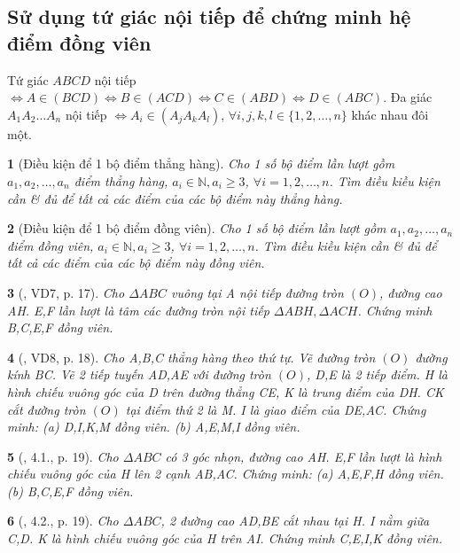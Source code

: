 \documentclass{article}
\newtheorem{baitoan}{}
\begin{document}
\subsection{Sử dụng tứ giác nội tiếp để chứng minh hệ điểm đồng viên}
 Tứ giác $ABCD$ nội tiếp $\Leftrightarrow A\in(BCD)\Leftrightarrow B\in(ACD)\Leftrightarrow C\in(ABD)\Leftrightarrow D\in(ABC)$.  Đa giác $A_1A_2\ldots A_n$ nội tiếp $\Leftrightarrow A_i\in(A_jA_kA_l)$, $\forall i,j,k,l\in\{1,2,\ldots,n\}$ khác nhau đôi một.

\begin{baitoan}[Điều kiện để 1 bộ điểm thẳng hàng]
	Cho 1 số bộ điểm lần lượt gồm $a_1,a_2,\ldots,a_n$ điểm thẳng hàng, $a_i\in\mathbb{N},a_i\ge3$, $\forall i = 1,2,\ldots,n$. Tìm điều kiều kiện cần \& đủ để tất cả các điểm của các bộ điểm này thẳng hàng.
\end{baitoan}

\begin{baitoan}[Điều kiện để 1 bộ điểm đồng viên]
	Cho 1 số bộ điểm lần lượt gồm $a_1,a_2,\ldots,a_n$ điểm đồng viên, $a_i\in\mathbb{N},a_i\ge3$, $\forall i = 1,2,\ldots,n$. Tìm điều kiều kiện cần \& đủ để tất cả các điểm của các bộ điểm này đồng viên.
\end{baitoan}

\begin{baitoan}[\cite{Thu_Chung_Viet_Minh_circ}, VD7, p. 17]
	Cho $\Delta ABC$ vuông tại A nội tiếp đường tròn $(O)$, đường cao AH. E,F lần lượt là tâm các đường tròn nội tiếp $\Delta ABH,\Delta ACH$. Chứng minh B,C,E,F đồng viên.
\end{baitoan}

\begin{baitoan}[\cite{Thu_Chung_Viet_Minh_circ}, VD8, p. 18]
	Cho A,B,C thẳng hàng theo thứ tự. Vẽ đường tròn $(O)$ đường kính BC. Vẽ 2 tiếp tuyến AD,AE với đường tròn $(O)$, D,E là 2 tiếp điểm. H là hình chiếu vuông góc của D trên đường thẳng CE, K là trung điểm của DH. CK cắt đường tròn $(O)$ tại điểm thứ 2 là M. I là giao điểm của DE,AC. Chứng minh: (a) D,I,K,M đồng viên. (b) A,E,M,I đồng viên.
\end{baitoan}

\begin{baitoan}[\cite{Thu_Chung_Viet_Minh_circ}, 4.1., p. 19]
	Cho $\Delta ABC$ có 3 góc nhọn, đường cao AH. E,F lần lượt là hình chiếu vuông góc của H lên 2 cạnh AB,AC. Chứng minh: (a) A,E,F,H đồng viên. (b) B,C,E,F đồng viên.
\end{baitoan}

\begin{baitoan}[\cite{Thu_Chung_Viet_Minh_circ}, 4.2., p. 19]
	Cho $\Delta ABC$, 2 đường cao AD,BE cắt nhau tại H. I nằm giữa C,D. K là hình chiếu vuông góc của H trên AI. Chứng minh C,E,I,K đồng viên.
\end{baitoan}
\end{document}
